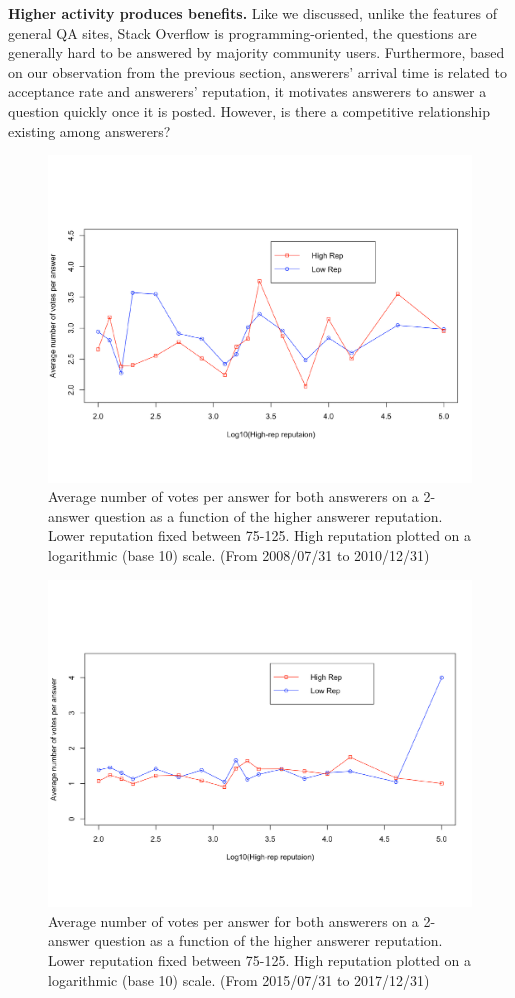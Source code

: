 \textbf{Higher activity produces benefits.}
Like we discussed, unlike the features of general QA sites, Stack Overflow is programming-oriented, the questions are generally hard to be answered by majority community users. Furthermore, based on our observation from the previous section, answerers' arrival time is related to acceptance rate and answerers' reputation, it motivates answerers to answer a question quickly once it is posted. However, is there a competitive relationship existing among answerers?

\begin{figure}[!t]
    \centering
    \includegraphics[width=0.8\columnwidth]{img/Fig6_2010.pdf}
    \caption{Average number of votes per answer for both answerers on a 2-answer question as a function of the higher answerer reputation. Lower reputation fixed between 75-125. High reputation plotted on a logarithmic (base 10) scale. (From 2008/07/31 to 2010/12/31)}
    \label{fig:fig6_2010}
\end{figure}

\begin{figure}[!t]
    \centering
    \includegraphics[width=0.8\columnwidth]{img/Fig6_2017.pdf}
    \caption{Average number of votes per answer for both answerers on a 2-answer question as a function of the higher answerer reputation. Lower reputation fixed between 75-125. High reputation plotted on a logarithmic (base 10) scale. (From 2015/07/31 to 2017/12/31)}
    \label{fig:fig6_2017}
\end{figure}

